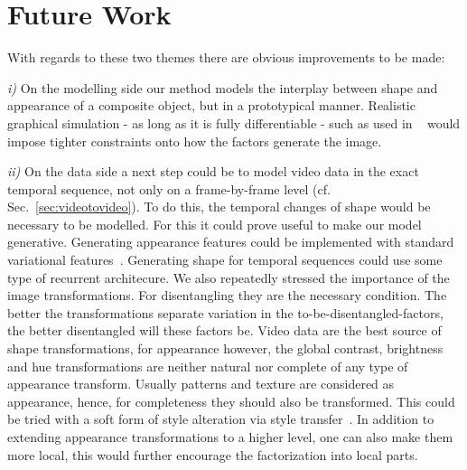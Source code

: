 \section{Future Work}\label{sec:futurework}


	With regards to these two themes there are obvious improvements to be made:


	\emph{i)} On the modelling side our method models the interplay between shape and appearance of a composite object, but in a prototypical manner. Realistic graphical simulation - as long as it is fully differentiable - such as used in ~\cite{kulkarni15dcign, tieleman14thesis} would impose tighter constraints onto how the factors generate the image.

	\emph{ii)} On the data side a next step could be to model video data in the exact temporal sequence, not only on a frame-by-frame level (cf. Sec.~\ref{sec:videotovideo}). To do this, the temporal changes of shape would be necessary to be modelled. For this it could prove useful to make our model generative. Generating appearance features could be implemented with standard variational features~\cite{kingma13vae}. Generating shape for temporal sequences could use some type of recurrent architecure.
	We also repeatedly stressed the importance of the image transformations. For disentangling they are the necessary condition. The better the transformations separate variation in the to-be-disentangled-factors, the better disentangled will these factors be. Video data are the best source of shape transformations, for appearance however, the global contrast, brightness and hue transformations are neither natural nor complete of any type of appearance transform. Usually patterns and texture are considered as appearance, hence, for completeness they should also be transformed. This could be tried with a soft form of style alteration via style transfer~\cite{gatys15neuralstyle}. In addition to extending appearance transformations to a higher level, one can also make them more local, this would further encourage the factorization into local parts.


